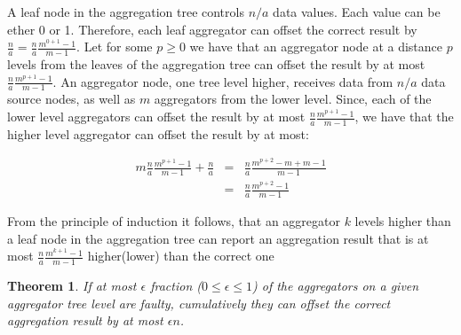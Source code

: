 \documentclass{article}
\newtheorem{thm}{Theorem}[section]
\newenvironment{proof}[1][Proof]{\begin{trivlist}
\item[\hskip \labelsep {\bfseries #1}]}{\end{trivlist}}
\begin{document}
\begin{proof}
A leaf node in the aggregation tree controls $n/a$ data values. Each
value can be ether 0 or 1. Therefore, each leaf aggregator can offset
the correct result by $\frac{n}{a} = \frac{n}{a}\frac{m^{0+1}-1}{m-1}$.
Let for some $p \geq 0$ we have that an aggregator node at a distance
$p$ levels from the leaves of the aggregation tree can offset the
result by at most $\frac{n}{a}\frac{m^{p+1}-1}{m-1}$. An aggregator
node, one tree level higher, receives data from $n/a$ data source
nodes, as well as $m$ aggregators from the lower level. Since, each of
the lower level aggregators can offset the result by at most
$\frac{n}{a}\frac{m^{p+1}-1}{m-1}$, we have that the higher level
aggregator can offset the result by at most:

\begin{eqnarray*}
m\frac{n}{a}\frac{m^{p+1}-1}{m-1} + \frac{n}{a} &=&
\frac{n}{a}\frac{m^{p+2}-m+m-1}{m-1}\\
&=& \frac{n}{a}\frac{m^{p+2}-1}{m-1}
\end{eqnarray*}
\end{proof}


\noindent From the principle of induction it follows, that an aggregator $k$
levels higher than a leaf node in the aggregation tree can report an
aggregation result that is at most $\frac{n}{a}\frac{m^{k+1} -1}{m-1}$
higher(lower) than the correct one 

\begin{thm} 
\label{thm:faulty}
If at most $\epsilon$ fraction ($0 \leq \epsilon \leq 1$)
  of the aggregators on a given aggregator tree level are faulty,
  cumulatively  they can offset the correct aggregation result by at
  most  $\epsilon n$.
\end{thm} 
\end{document}
